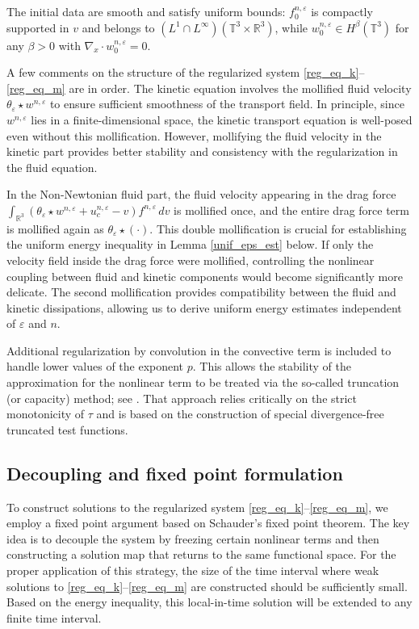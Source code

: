 \documentclass[10pt,reqno]{amsart}
\numberwithin{equation}{section}
\newcommand{\R}{\mathbb R}
\newcommand{\T}{\mathbb T}
\newcommand{\e}{\varepsilon}
\begin{document}
The initial data are smooth and satisfy uniform bounds: $f_0^{n,\e}$ is compactly supported in $v$ and belongs to $(L^1 \cap L^\infty)(\T^3 \times \R^3)$, while $w_0^{n,\e} \in H^\beta(\T^3)$ for any $\beta > 0$ with $\nabla_x \cdot w_0^{n,\e} = 0$.
 
A few comments on the structure of the regularized system \eqref{reg_eq_k}--\eqref{reg_eq_m} are in order. The kinetic equation involves the mollified fluid velocity $\theta_\e \star w^{n,\e}$ to ensure sufficient smoothness of the transport field. In principle, since $w^{n,\e}$ lies in a finite-dimensional space, the kinetic transport equation is well-posed even without this mollification. However, mollifying the fluid velocity in the kinetic part provides better stability and consistency with the regularization in the fluid equation.

In the Non-Newtonian fluid part, the fluid velocity appearing in the drag force $\int_{\R^3} (\theta_\e \star w^{n,\e} +u_c^{n,\e}-v)f^{n,\e}\,dv$ is mollified once, and the entire drag force term is mollified again as $\theta_\e \star (\cdot)$. This double mollification is crucial for establishing the uniform energy inequality in Lemma \ref{unif_eps_est} below. If only the velocity field inside the drag force were mollified, controlling the nonlinear coupling between fluid and kinetic components would become significantly more delicate. The second mollification provides compatibility between the fluid and kinetic dissipations, allowing us to derive uniform energy estimates independent of $\varepsilon$ and $n$.

Additional regularization by convolution in the convective term is included to handle lower values of the exponent $p$. This allows the stability of the approximation for the nonlinear term to be treated via the so-called truncation (or capacity) method; see \cite{FMS97,FMS00}. That approach relies critically on the strict monotonicity of $\tau$ and is based on the construction of special divergence-free truncated test functions.
 
%
%
% 
%
%
\subsection{Decoupling and fixed point formulation}
To construct solutions to the regularized system \eqref{reg_eq_k}--\eqref{reg_eq_m}, we employ a fixed point argument based on Schauder's fixed point theorem. The key idea is to decouple the system by freezing certain nonlinear terms and then constructing a solution map that returns to the same functional space. For the proper application of this strategy, the size of the time interval where weak solutions to \eqref{reg_eq_k}--\eqref{reg_eq_m} are constructed should be sufficiently small. Based on the energy inequality, this local-in-time solution will be extended to any finite time interval.
\end{document}
